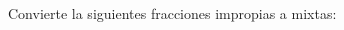 \documentclass[12pt,addpoints]{evalua}
\begin{document}
\begin{questions}
\begin{multicols}{2}
\begin{parts}
        \end{parts}
    \end{multicols}


    \question[4] Convierte la siguientes fracciones impropias a mixtas:
 
    \begin{multicols}{3}
    \end{multicols}




\end{questions}
\end{document}
